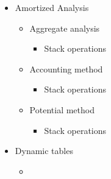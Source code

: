 \begin{itemize}
  \item Amortized Analysis
  \begin{itemize}
    \item Aggregate analysis
    \begin{itemize}
      \item Stack operations
    \end{itemize}
    \item Accounting method
    \begin{itemize}
      \item Stack operations
    \end{itemize}
    \item Potential method
    \begin{itemize}
      \item Stack operations
    \end{itemize}
  \end{itemize}
  \item Dynamic tables
  \begin{itemize}
    \item
  \end{itemize}
\end{itemize}
